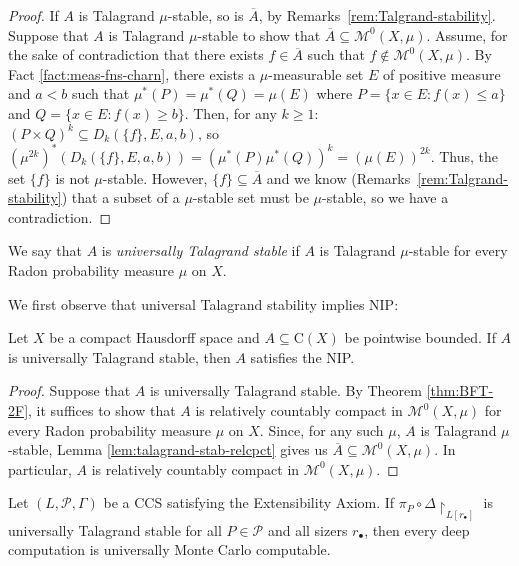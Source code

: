 \begin{proof}
    If $A$ is Talagrand $\mu$-stable, so is $\overline{A}$, by Remarks~\ref{rem:Talgrand-stability}.
    Suppose that $A$ is Talagrand $\mu$-stable to show that $\overline{A}\subseteq \mathscr{M}^0(X,\mu)$.
    Assume, for the sake of contradiction that there exists $f\in\overline{A}$ such that $f\notin \mathscr{M}^0(X,\mu)$.
    By Fact \ref{fact:meas-fns-charn}, there exists a $\mu$-measurable set $E$ of positive measure and $a<b$ such that $\mu^*(P)=\mu^*(Q)=\mu(E)$ where $P=\{x\in E: f(x)\leq a\}$ and $Q=\{x\in E: f(x)\geq b\}$.
    Then, for any $k\geq 1$: $(P\times Q)^k\subseteq D_k(\{f\},E,a,b)$, so $(\mu^{2k})^*(D_k(\{f\},E,a,b))=(\mu^*(P)\mu^*(Q))^k=(\mu(E))^{2k}$.
    Thus, the set $\{f\}$ is not $\mu$-stable. 
    However, $\{f\}\subseteq\overline{A}$ and we know (Remarks~\ref{rem:Talgrand-stability}) that a subset of a $\mu$-stable set must be $\mu$-stable,
    so we have a contradiction.
\end{proof}

\begin{definition}
We say that $A$ is \emph{universally Talagrand stable} if $A$ is Talagrand $\mu$-stable for every Radon probability measure $\mu$ on $X$.
\end{definition}

We first observe that universal Talagrand stability implies NIP:

\begin{proposition}\label{prop:Talagrand-implies-NIP}
    Let $X$ be a compact Hausdorff space and $A\subseteq \mathrm{C}(X)$ be pointwise bounded.
    If $A$ is universally Talagrand stable, then $A$ satisfies the NIP.
\end{proposition}

\begin{proof}
    Suppose that $A$ is universally Talagrand stable.
    By Theorem \ref{thm:BFT-2F}, it suffices to show that $A$ is relatively countably compact in $\mathscr{M}^0(X,\mu)$ for every Radon probability measure $\mu$ on $X$.
    Since, for any such $\mu$, $A$ is Talagrand $\mu$-stable, Lemma \ref{lem:talagrand-stab-relcpct} gives us $\overline{A}\subseteq\mathscr{M}^0(X,\mu)$.
    In particular, $A$ is relatively countably compact in $\mathscr{M}^0(X,\mu)$.
\end{proof}

\begin{corollary}
\label{cor:Talagrand-stab-Monte-Carlo}
    Let $(L,\mathcal{P},\Gamma)$ be a CCS satisfying the Extensibility Axiom.
If $\pi_P\circ\Delta\restriction_{L[r_\bullet]}$ is universally Talagrand stable for all $P\in\mathcal{P}$ and all sizers $r_{\bullet}$, then every deep computation is universally Monte Carlo computable.
\end{corollary}

